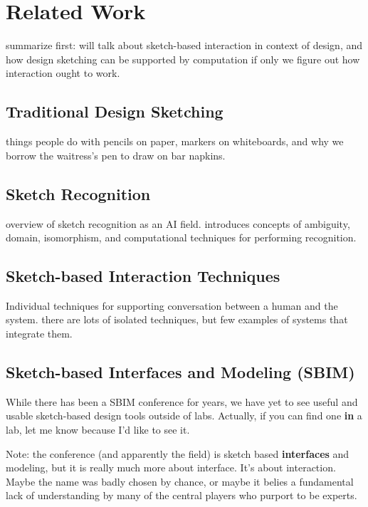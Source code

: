 \chapter{Related Work}

summarize first: will talk about sketch-based interaction in context
of design, and how design sketching can be supported by computation if
only we figure out how interaction ought to work.

\section{Traditional Design Sketching}

things people do with pencils on paper, markers on whiteboards, and
why we borrow the waitress's pen to draw on bar napkins.

\section{Sketch Recognition}

overview of sketch recognition as an AI field. introduces concepts of
ambiguity, domain, isomorphism, and computational techniques for
performing recognition.

\section{Sketch-based Interaction Techniques}

Individual techniques for supporting conversation between a human and
the system. there are lots of isolated techniques, but few examples of
systems that integrate them.

\section{Sketch-based Interfaces and Modeling (SBIM)}

While there has been a SBIM conference for years, we have yet to see
useful and usable sketch-based design tools outside of labs. Actually,
if you can find one \textbf{in} a lab, let me know because I'd like to
see it.

Note: the conference (and apparently the field) is sketch based
\textbf{interfaces} and modeling, but it is really much more about
interface. It's about interaction. Maybe the name was badly chosen by
chance, or maybe it belies a fundamental lack of understanding by many
of the central players who purport to be experts.



